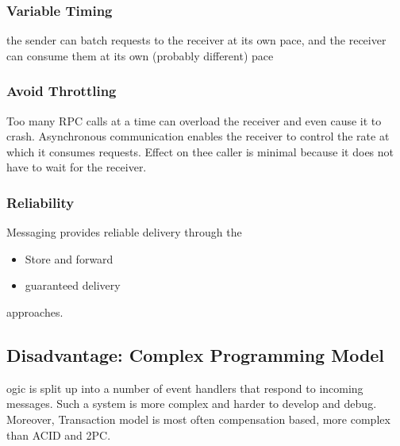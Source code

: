 			\subsubsection{Variable Timing}
				the	sender can batch requests to the receiver at its own pace, and the receiver can consume them  at its own (probably different) pace
			\subsubsection{Avoid Throttling}
				Too many RPC calls at a time can overload the receiver and even cause it to crash. Asynchronous communication enables the receiver to control the rate at which it consumes requests. Effect on thee caller is minimal because it does not have to wait for the receiver.
			\subsubsection{Reliability}
				Messaging provides reliable delivery through the
				\begin{itemize}
					\item Store and forward
					\item guaranteed delivery
				\end{itemize}
				approaches.
				
			
		\subsection{Disadvantage: Complex Programming Model}
			ogic is split up into a number of event handlers that respond to incoming messages. Such a system is more complex and harder to develop and debug.\\
			Moreover, Transaction model is most often compensation based, more complex than ACID and 2PC.
			
			\pagebreak %
			
			

